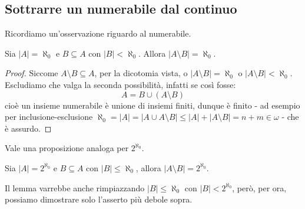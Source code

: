 \subsection{Sottrarre un  numerabile dal continuo}
Ricordiamo un'osservazione riguardo al numerabile.

\begin{remark}[Numerabile - finito = numerabile]
	\label{numerabile - finito}
	Sia $|A| = \aleph_0$ e $B \subseteq A$ con $|B|<\aleph_0$. Allora $|A \setminus B| = \aleph_0$.
\end{remark}

\begin{proof}
	Siccome $A \setminus B \subseteq A$, per la dicotomia vista, o $|A \setminus B| = \aleph_0$ o $|A \setminus B|<\aleph_0$.
	Escludiamo che valga la seconda possibilità, infatti se così fosse:
	\[ A = B \cup (A \setminus B)
		\]
	cioè un insieme numerabile è unione di insiemi finiti, dunque è finito - ad esempio per inclusione-esclusione $\aleph_0 = |A| = |A \cup A\setminus B| \leq |A| + |A \setminus B| = n + m \in \omega$ - che è assurdo.
\end{proof}

Vale una proposizione analoga per $2^{\aleph_0}$.

\begin{lemma}[Continuo - al più numerabile = continuo]
	\label{continuo-numerabile}
	Sia $|A| = 2^{\aleph_0}$ e $B \subseteq A$ con $|B| \leq \aleph_0$, allora $|A \setminus B| = 2^{\aleph_0}$.
\end{lemma}

\begin{note}[Continuo - al più continuo (escluso) = continuo]
	Il lemma varrebbe anche rimpiazzando $|B| \leq \aleph_0$ con $|B| < 2^{\aleph_0}$, però, per ora, possiamo dimostrare solo l'asserto più debole sopra.
\end{note}

